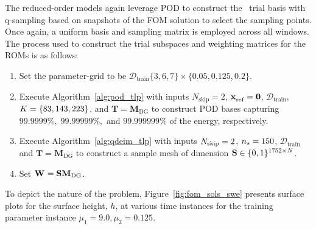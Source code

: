 The reduced-order models again leverage POD to construct the \spatialAcronym\ trial basis with q-sampling based on snapshots of the FOM solution to select the sampling points. Once again, a uniform basis and sampling matrix is employed across all windows. The process used to construct the trial subspaces and weighting matrices for the ROMs is as follows:
\begin{enumerate}
\item Set the parameter-grid to be $\mathcal{D}_{\text{train}}  \{ 3,6,7 \} \times \{0.05,0.125,0.2\}$. 
\item Execute Algorithm~\ref{alg:pod_tlp} with inputs $N_{\text{skip}} = 2$, $\mathbf{x}_\text{ref}^{} = \boldsymbol 0$, $\mathcal{D}_{\text{train}}$, $K = \{ 83,143 ,223 \}$, and $\mathbf{T} = \mathbf{M}_{\text{DG}}$ to construct POD bases capturing $99.9999\%, \; 99.99999\%,$ and $99.999999\%$ of the energy, respectively.
\item Execute Algorithm~\ref{alg:qdeim_tlp} with inputs $N_{\text{skip}} = 2$, $n_s = 150$, $\mathcal{D}_{\text{train}}$ and $\mathbf{T} = \mathbf{M}_{\text{DG}}$ to construct a sample mesh of dimension $\mathbf{S} \in \{0,1\}^{1752\times N }$.
 \item Set $\mathbf{W}^{} = \mathbf{S} \mathbf{M}_{\text{DG}}$. 
\end{enumerate}  
To depict the nature of the problem, Figure~\ref{fig:fom_sols_swe} presents surface plots for the surface height, $h$, at various time instances for the training parameter instance $\mu_1 = 9.0,\mu_2 = 0.125$.
